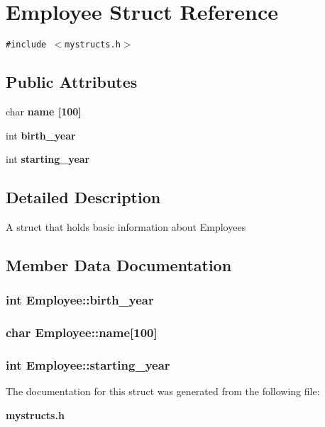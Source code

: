\section{Employee Struct Reference}
\label{structEmployee}
{\tt \#include $<$mystructs.h$>$}

\subsection*{Public Attributes}
\begin{CompactItemize}
\item 
char \bf{name} [100]
\item 
int \bf{birth\_\-year}
\item 
int \bf{starting\_\-year}
\end{CompactItemize}


\subsection{Detailed Description}
A struct that holds basic information about Employees 



\subsection{Member Data Documentation}
\subsubsection{\setlength{\rightskip}{0pt plus 5cm}int \bf{Employee::birth\_\-year}}\label{structEmployee_ef62371f00cb7dcd71e6317c132f8cf6}


\subsubsection{\setlength{\rightskip}{0pt plus 5cm}char \bf{Employee::name}[100]}\label{structEmployee_5c22a449e0d04a855087ba98c5d154b2}


\subsubsection{\setlength{\rightskip}{0pt plus 5cm}int \bf{Employee::starting\_\-year}}\label{structEmployee_e0c81c6e5da7d33ccdb1c3f57455818d}




The documentation for this struct was generated from the following file:\begin{CompactItemize}
\item 
\bf{mystructs.h}\end{CompactItemize}
